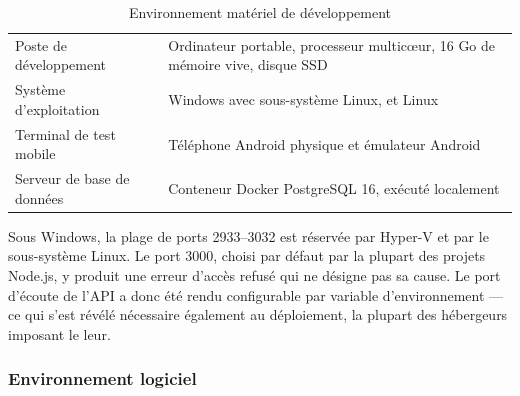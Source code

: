 \begin{table}[H]
\centering
\caption{Environnement matériel de développement}
\label{tab:env-materiel}
\begin{tabularx}{\textwidth}{L{4.2cm} X}
\toprule
{} &  \\
\midrule
Poste de développement & Ordinateur portable, processeur multic\oe ur, 16 Go
de mémoire vive, disque SSD \\
Système d'exploitation & Windows avec sous-système Linux, et Linux \\
Terminal de test mobile & Téléphone Android physique et émulateur Android \\
Serveur de base de données & Conteneur Docker PostgreSQL 16, exécuté localement \\
\bottomrule
\end{tabularx}
\end{table}

\begin{attention}
Sous Windows, la plage de ports 2933--3032 est réservée par Hyper-V et par le
sous-système Linux. Le port 3000, choisi par défaut par la plupart des projets
Node.js, y produit une erreur d'accès refusé qui ne désigne pas sa cause. Le
port d'écoute de l'API a donc été rendu configurable par variable
d'environnement --- ce qui s'est révélé nécessaire également au déploiement,
la plupart des hébergeurs imposant le leur.
\end{attention}

\subsubsection{Environnement logiciel}

